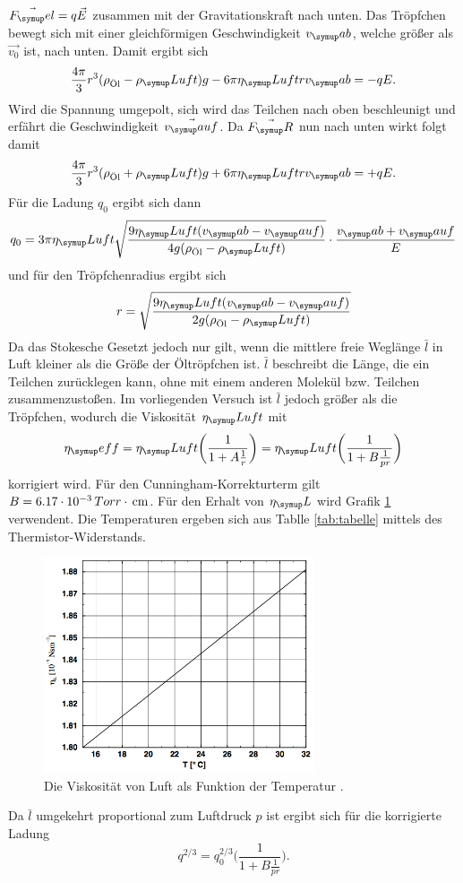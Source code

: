 $\vec{F_\su{el}}=q\vec{E}$ zusammen mit der Gravitationskraft nach unten. Das
Tröpfchen bewegt sich mit einer gleichförmigen Geschwindigkeit $v_\su{ab}$,
welche größer als $\vec{v_0}$ ist, nach unten. Damit ergibt sich
\begin{equation}
  \frac{4\pi}{3}r^3(\rho_\text{Öl}-\rho_\su{Luft})g-6\pi \eta_\su{Luft} r v_\su{ab}
  =-qE.
\end{equation}
Wird die Spannung umgepolt, sich wird das Teilchen nach oben beschleunigt und
erfährt die Geschwindigkeit $\vec{v_\su{auf}}$. Da $\vec{F_\su{R}}$ nun nach unten
wirkt folgt damit
\begin{equation}
  \frac{4\pi}{3}r^3(\rho_\text{Öl}+\rho_\su{Luft})g+6\pi \eta_\su{Luft} r v_\su{ab}
  =+qE.
\end{equation}
Für die Ladung $q_0$ ergibt sich dann
\begin{equation}
  q_0 = 3\pi \eta_\su{Luft} \sqrt{\frac{9\eta_\su{Luft}(v_\su{ab}-v_\su{auf})}
  {4g(\rho_\text{Öl}-\rho_\su{Luft})}} \cdot \frac{v_\su{ab}+v_\su{auf}}{E}
  \label{eqn:q0}
\end{equation}
und für den Tröpfchenradius ergibt sich
\begin{equation}
  r = \sqrt{\frac{9\eta_\su{Luft}(v_\su{ab}-v_\su{auf})}
  {2g(\rho_\text{Öl}-\rho_\su{Luft})}}
\end{equation}
Da das Stokesche Gesetzt jedoch nur gilt, wenn die mittlere freie Weglänge $\bar{l}$
in Luft kleiner als die Größe der Öltröpfchen ist. $\bar{l}$ beschreibt die Länge,
die ein Teilchen zurücklegen kann, ohne mit einem anderen Molekül bzw. Teilchen
zusammenzustoßen. Im vorliegenden Versuch ist $\bar{l}$ jedoch größer als die Tröpfchen,
wodurch die Viskosität $\eta_\su{Luft}$ mit
\begin{equation}
  \eta_\su{eff} = \eta_\su{Luft}\bigg(\frac{1}{1+A\frac{1}{r}}\bigg)=\eta_\su{Luft}
  \bigg(\frac{1}{1+B\frac{1}{pr}}\bigg)
  \label{eqn:n}
\end{equation}
korrigiert wird. Für den Cunningham-Korrekturterm gilt $B=6.17\cdot 10^{-3}
\,Torr \cdot \,\si{\centi\meter}$.
Für den Erhalt von $\eta_\su{L}$ wird Grafik \ref{fig:grafik} verwendent. Die
Temperaturen ergeben sich aus Tablle \ref{tab:tabelle} mittels des Thermistor-Widerstands.
\begin{figure}
  \centering
  \includegraphics[width=8cm]{bilder/grafik.png}
  \caption{Die Viskosität von Luft als Funktion der Temperatur \cite{503}.}
  \label{fig:grafik}
\end{figure}
Da $\bar{l}$ umgekehrt proportional zum Luftdruck $p$ ist ergibt sich für die
korrigierte Ladung
\begin{equation}
  q^{2/3}=q_0^{2/3} \bigg(\frac{1}{1+B\frac{1}{pr}}\bigg). \label{eqn:q}
\end{equation}
